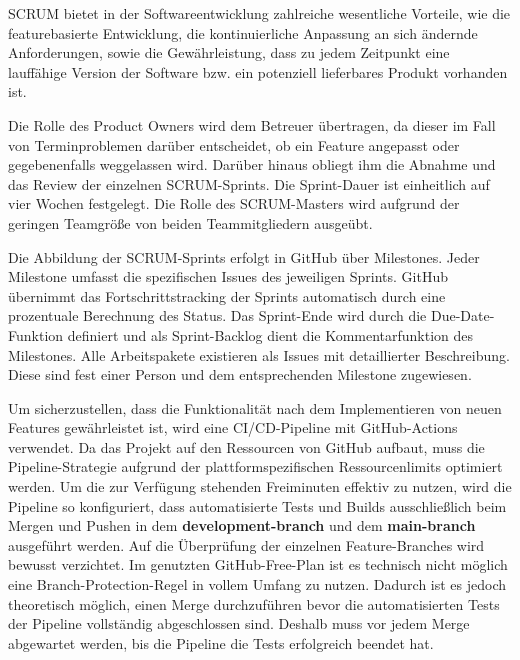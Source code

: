 \gls{SCRUM} bietet in der Softwareentwicklung zahlreiche wesentliche Vorteile\cite{SCRUM_entscheidungen}, wie die featurebasierte Entwicklung, die kontinuierliche Anpassung an sich ändernde Anforderungen, sowie die Gewährleistung, dass zu jedem Zeitpunkt eine lauffähige Version der Software bzw. ein potenziell lieferbares Produkt vorhanden ist.

Die Rolle des Product Owners wird dem Betreuer übertragen, da dieser im Fall von Terminproblemen darüber entscheidet, ob ein Feature angepasst oder gegebenenfalls weggelassen wird. Darüber hinaus obliegt ihm die Abnahme und das Review der einzelnen \gls{SCRUM}-Sprints. Die Sprint-Dauer ist einheitlich auf vier Wochen festgelegt. Die Rolle des \gls{SCRUM}-Masters wird aufgrund der geringen Teamgröße von beiden Teammitgliedern ausgeübt.

Die Abbildung der \gls{SCRUM}-Sprints erfolgt in GitHub über Milestones. Jeder Milestone\cite{codetree2017sprintplanning} umfasst die spezifischen Issues des jeweiligen Sprints. GitHub übernimmt das Fortschritts\-tracking der Sprints automatisch\cite{github2026milestones} durch eine prozentuale Berechnung des Status. Das Sprint-Ende wird durch die Due-Date-Funktion definiert und als Sprint-Backlog dient die Kommentarfunktion des Milestones. Alle Arbeitspakete existieren als Issues mit detaillierter Beschreibung. Diese sind fest einer Person und dem entsprechenden Milestone zugewiesen\cite{github2026associatingmilestones}.

Um sicherzustellen, dass die Funktionalität nach dem Implementieren von neuen Features gewährleistet ist, wird eine \gls{CI/CD}-Pipeline\cite{cogent2025devsecopsCICD} mit GitHub-Actions\cite{github2026actionsquickstart} verwendet.
Da das Projekt auf den Ressourcen von GitHub aufbaut, muss die Pipeline-Strategie aufgrund der plattformspezifischen Ressourcenlimits\cite{github2026actionslimits} optimiert werden.
Um die zur Verfügung stehenden Freiminuten effektiv zu nutzen, wird die Pipeline so konfiguriert, dass automatisierte Tests und Builds ausschließlich beim Mergen und Pushen in dem \textbf{development-branch} und dem \textbf{main-branch} ausgeführt werden. Auf die Überprüfung der einzelnen Feature-Branches wird bewusst verzichtet.\newline
Im genutzten GitHub-Free-Plan\cite{github2026plans} ist es technisch nicht möglich eine Branch-Protection-Regel in vollem Umfang zu nutzen\cite{github2026protectedbranches}. Dadurch ist es jedoch theoretisch möglich, einen Merge durchzuführen bevor die automatisierten Tests der Pipeline vollständig abgeschlossen sind. Deshalb muss vor jedem Merge abgewartet werden, bis die Pipeline die Tests erfolgreich beendet hat. 

